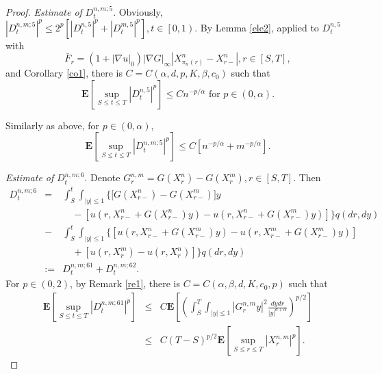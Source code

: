\documentclass[11pt]{amsart}
\theoremstyle{plain}
\numberwithin{equation}{section}
\begin{document}
\begin{proof}
\emph{Estimate of }$D_{t}^{n,m;5}$. Obviously, $\left\vert
D_{t}^{n,m;5}\right\vert ^{p}\leq 2^{p}[\left\vert D_{t}^{n,5}\right\vert
^{p}+\left\vert D_{t}^{m,5}\right\vert ^{p}],t\in \left[ 0,1\right) $. By
Lemma \ref{ele2}, applied to $D_{t}^{n,5}$ with 
\begin{equation*}
\bar{F}_{r}=\left( 1+|\nabla u|_{0}\right) \left\vert \nabla G\right\vert
_{\infty }\left\vert X_{\pi _{n}\left( r\right) }^{n}-X_{r-}^{n}\right\vert
,r\in \left[ S,T\right] ,
\end{equation*}and Corollary \ref{co1}, there is $C=C\left( \alpha ,d,p,K,\beta
,c_{0}\right) $ such that 
\begin{equation*}
\mathbf{E}\left[ \sup_{S\leq t\leq T}\left\vert D_{t}^{n,5}\right\vert ^{p}\right] \leq Cn^{-p/\alpha }\text{ for }p\in \left( 0,\alpha \right) .
\end{equation*}

Similarly as above, for $p\in\left( 0,\alpha\right)$, 
\begin{equation*}
\mathbf{E}\left[ \sup_{S\leq t\leq T}\left\vert D_{t}^{n,m;5}\right\vert ^{p}\right] \leq C\left[ n^{-p/\alpha }+m^{-p/\alpha }\right] .
\end{equation*}

\emph{Estimate of }$D_{t}^{n,m;6}$. Denote $G_{r}^{n,m}=G\left(
X_{r}^{n}\right) -G\left( X_{r}^{m}\right) ,r\in \left[ S,T\right] $. Then 
\begin{eqnarray*}
D_{t}^{n,m;6} &=&\int_{S}^{t}\int_{\left\vert y\right\vert \leq 1}\Big\{\lbrack G\left( X_{r-}^{n}\right) -G\left( X_{r-}^{m}\right) ]y \\
&&\quad -\left[ u\left( r,X_{r-}^{n}+G\left( X_{r-}^{n}\right) y\right)
-u\left( r,X_{r-}^{n}+G\left( X_{r-}^{m}\right) y\right) \right] \Big\}q\left( dr,dy\right) \\
&-&\int_{S}^{t}\int_{\left\vert y\right\vert \leq 1}\{[u\left(
r,X_{r-}^{n}+G\left( X_{r-}^{m}\right) y\right) -u\left(
r,X_{r-}^{m}+G\left( X_{r-}^{m}\right) y\right) ] \\
&&\quad +\left[ u\left( r,X_{r}^{m}\right) -u\left( r,X_{r}^{n}\right) \right] \}q\left( dr,dy\right) \\
&:=&D_{t}^{n,m;61}+D_{t}^{n,m;62}.
\end{eqnarray*}For $p\in \left( 0,2\right) $, by Remark \ref{re1}, there is $C=C\left(
\alpha ,\beta ,d,K,c_{0},p\right) $ such that\begin{eqnarray*}
\mathbf{E}\left[ \sup_{S\leq t\leq T}\left\vert D_{t}^{n,m;61}\right\vert
^{p}\right] &\leq &C\mathbf{E}\left[ \left( \int_{S}^{T}\int_{\left\vert
y\right\vert \leq 1}\left\vert G_{r}^{n,m}y\right\vert ^{2}\frac{dydr}{\left\vert y\right\vert ^{d+\alpha }}\right) ^{p/2}\right] \\
&\leq &C\left( T-S\right) ^{p/2}\mathbf{E}\left[ \sup_{S\leq r\leq
T}\left\vert X_{r}^{n,m}\right\vert ^{p}\right] .
\end{eqnarray*}


\end{proof}
\end{document}
